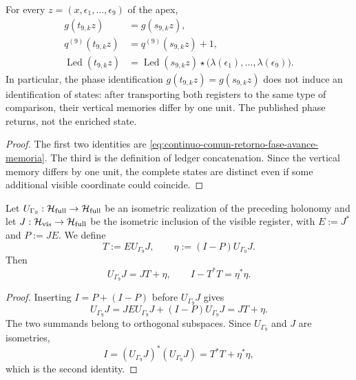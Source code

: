\begin{proposition}
\label{prop:continuo-comun-gamma9-retorno-memoria}
For every \(z=(x,\epsilon_1,\ldots,\epsilon_9)\) of the apex,
\begin{align}
 g(t_{9,k}z)&=g(s_{9,k}z),
 \label{eq:continuo-comun-gamma9-retorno-fase}\\
 q^{(9)}(t_{9,k}z)&=q^{(9)}(s_{9,k}z)+1,
 \label{eq:continuo-comun-gamma9-avance-memoria}\\
 \operatorname{Led}(t_{9,k}z)
 &=\operatorname{Led}(s_{9,k}z)\star
   \bigl(\lambda(\epsilon_1),\ldots,\lambda(\epsilon_9)\bigr).
 \label{eq:continuo-comun-gamma9-ledger}
\end{align}
In particular, the phase identification
\(g(t_{9,k}z)=g(s_{9,k}z)\) does not induce an identification of states: after
transporting both registers to the same type of comparison, their vertical
memories differ by one unit. The published phase returns, not the
enriched state.
\end{proposition}

\begin{proof}
The first two identities are
\eqref{eq:continuo-comun-retorno-fase-avance-memoria}. The third is the
definition of ledger concatenation. Since the vertical memory differs by
one unit, the complete states are distinct even if some additional visible
coordinate could coincide.
\end{proof}

\begin{proposition}
\label{prop:continuo-comun-gamma9-compresion-isometrica}
Let \(U_{\Gamma_9}:\mathcal H_{\rm full}\to\mathcal H_{\rm full}\) be an
isometric realization of the preceding holonomy and let
\(J:\mathcal H_{\rm vis}\to\mathcal H_{\rm full}\) be the isometric inclusion
of the visible register, with \(E:=J^*\) and \(P:=JE\). We define
\begin{equation}
\label{eq:continuo-comun-gamma9-compresion-datos}
 T:=EU_{\Gamma_9}J,\qquad
 \eta:=(I-P)U_{\Gamma_9}J.
\end{equation}
Then
\begin{equation}
\label{eq:continuo-comun-gamma9-compresion}
 \boxed{\;
 U_{\Gamma_9}J=JT+\eta,\qquad
 I-T^*T=\eta^*\eta.
 \;}
\end{equation}
\end{proposition}

\begin{proof}
Inserting \(I=P+(I-P)\) before \(U_{\Gamma_9}J\) gives
\[
 U_{\Gamma_9}J
 =JEU_{\Gamma_9}J+(I-P)U_{\Gamma_9}J
 =JT+\eta.
\]
The two summands belong to orthogonal subspaces. Since
\(U_{\Gamma_9}\) and \(J\) are isometries,
\[
 I=(U_{\Gamma_9}J)^*(U_{\Gamma_9}J)
   =T^*T+\eta^*\eta,
\]
which is the second identity.
\end{proof}

